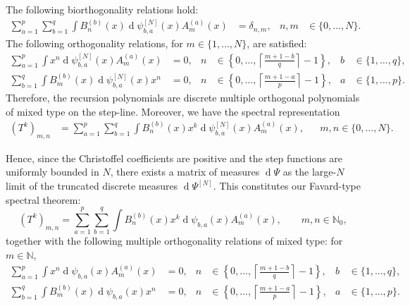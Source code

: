 \documentclass[11pt]{amsart}
\theoremstyle{plain}
\renewcommand{\d}{\operatorname{d}}
\newcommand{\N}{\mathbb{N}}
\newcommand{\1}{\text{\fontseries{bx}\selectfont \textup 1}}
\begin{document}
The following biorthogonality relations hold:
\begin{align*}
	\sum_{a=1}^p\sum_{b=1}^{q} \int B^{(b)}_n(x)\d\psi^{[N]}_{b,a}(x)A^{(a)}_{m}(x)&=\delta_{n,m}, &n,m&\in\{0,\dots,N\}.
\end{align*}
The following orthogonality relations, for $m \in\{1,\dots, N\}$, are satisfied:
\begin{align*}
	\sum_{a=1}^p\int x^n\d\psi ^{[N]}_{b,a}(x)A^{(a)}_{m}(x)&=0, & 
	n&\in\left\{0,\dots,\left	\lceil \frac{m+1-b}{q}\right \rceil -1\right\},&	b&\in\{1,\dots,q\},\\
	\sum_{b=1}^q\int B^{(b)}_{m}(x)\d\psi ^{[N]}_{b,a}(x)x^n&=0, 
	& n&\in\left\{0,\dots,\left	\lceil \frac{m+1-a}{p}\right \rceil -1\right\}, & a&\in\{1,\dots,p\}.
\end{align*}
Therefore, the recursion polynomials are discrete multiple orthogonal polynomials of mixed type on the step-line. Moreover, we have the spectral representation
\[
\begin{aligned}
	(T^k)_{m,n}&=	\sum_{a=1}^p\sum_{b=1}^{q} \int B^{(b)}_n(x)x^k\d\psi^{[N]}_{b,a}(x)A^{(a)}_{m}(x),
&& m,n\in\{0,\dots,N\}.
\end{aligned}
\]

Hence, since the Christoffel coefficients are positive and the step functions are uniformly bounded in $N$, there exists a matrix of measures $\d\Psi$ as the large-$N$ limit of the truncated discrete measures $\d\Psi^{[N]}$. This constitutes our Favard-type spectral theorem:
\[
(T^k)_{m,n}=	\sum_{a=1}^p\sum_{b=1}^{q} \int B^{(b)}_n(x)x^k\d\psi_{b,a}(x)A^{(a)}_{m}(x),
\qquad m,n\in\N_0,
\]
together with the following multiple orthogonality relations of mixed type: for $m\in\N$,
\[\begin{aligned}
	\sum_{a=1}^p\int x^n\d\psi_{b,a}(x)A^{(a)}_{m}(x)&=0, & 
	n&\in\left\{0,\dots,\left	\lceil \frac{m+1-b}{q}\right \rceil -1\right\},&	b&\in\{1,\dots,q\},\\
	\sum_{b=1}^q\int B^{(b)}_{m}(x)\d\psi_{b,a}(x)x^n&=0, 
	& n&\in\left\{0,\dots,\left	\lceil \frac{m+1-a}{p}\right \rceil -1\right\}, & a&\in\{1,\dots,p\}.
\end{aligned}\]
\end{document}
